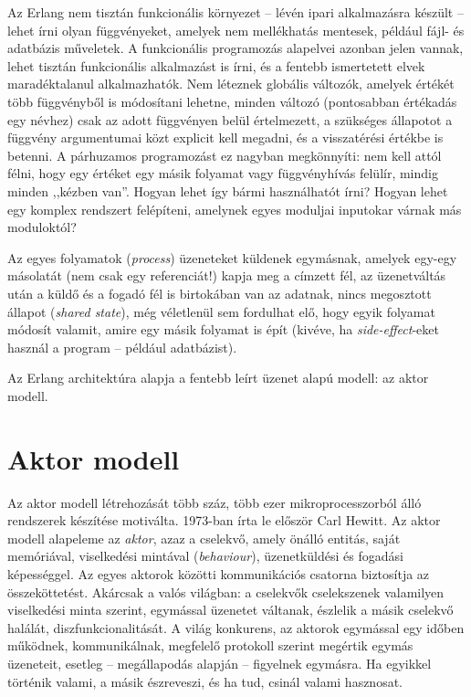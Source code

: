 \documentclass[12pt, a4paper, oneside]{book}
\begin{document}
Az Erlang nem tisztán funkcionális környezet -- lévén ipari alkalmazásra
készült -- lehet írni olyan függvényeket, amelyek nem mellékhatás mentesek,
például fájl- és adatbázis műveletek. A funkcionális programozás alapelvei
azonban jelen vannak, lehet tisztán funkcionális alkalmazást is írni, és a
fentebb ismertetett elvek maradéktalanul alkalmazhatók. Nem léteznek globális
változók, amelyek értékét több függvényből is módosítani lehetne, minden
változó (pontosabban értékadás egy névhez) csak az adott függvényen belül
értelmezett, a szükséges állapotot a függvény argumentumai közt explicit kell
megadni, és a visszatérési értékbe is betenni. A párhuzamos programozást ez
nagyban megkönnyíti: nem kell attól félni, hogy egy értéket egy másik folyamat
vagy függvényhívás felülír, mindig minden ,,kézben van''. Hogyan lehet így
bármi használhatót írni? Hogyan lehet egy komplex rendszert felépíteni,
amelynek egyes moduljai inputokar várnak más moduloktól?

Az egyes folyamatok (\emph{process}) üzeneteket küldenek egymásnak, amelyek
egy-egy másolatát (nem csak egy referenciát!) kapja meg a címzett fél, az
üzenetváltás után a küldő és a fogadó fél is birtokában van az adatnak, nincs
megosztott állapot (\emph{shared state}), még véletlenül sem fordulhat elő,
hogy egyik folyamat módosít valamit, amire egy másik folyamat is épít (kivéve,
ha \emph{side-effect}-eket használ a program -- például adatbázist).

Az Erlang architektúra alapja a fentebb leírt üzenet alapú modell: az aktor
modell.

\section{Aktor modell} 

Az aktor modell létrehozását több száz, több ezer mikroprocesszorból álló
rendszerek készítése motiválta. 1973-ban írta le először Carl Hewitt. Az aktor
modell alapeleme az \emph{aktor}, azaz a cselekvő, amely önálló entitás, saját
memóriával, viselkedési mintával (\emph{behaviour}), üzenetküldési és fogadási
képességgel. Az egyes aktorok közötti kommunikációs csatorna biztosítja az
összeköttetést. Akárcsak a valós világban: a cselekvők cselekszenek valamilyen
viselkedési minta szerint, egymással üzenetet váltanak, észlelik a másik
cselekvő halálát, diszfunkcionalitását. A világ konkurens, az aktorok egymással
egy időben működnek, kommunikálnak, megfelelő protokoll szerint megértik
egymás üzeneteit, esetleg -- megállapodás alapján -- figyelnek egymásra. Ha
egyikkel történik valami, a másik észreveszi, és ha tud, csinál valami
hasznosat.
\end{document}
